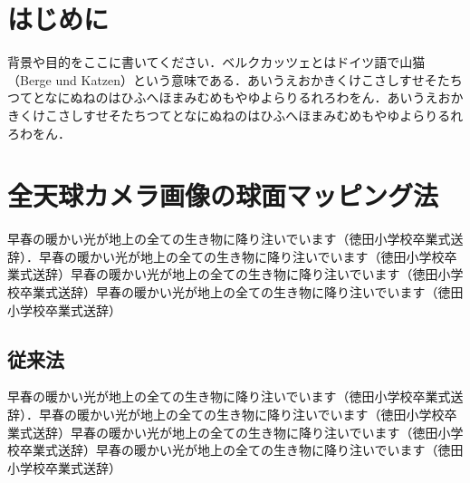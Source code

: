 \maketitle
\begin{multicols*}{2} %




\section{はじめに}
背景や目的をここに書いてください．ベルクカッツェとはドイツ語で山猫（Berge und Katzen）という意味である．あいうえおかきくけこさしすせそたちつてとなにぬねのはひふへほまみむめもやゆよらりるれろわをん．あいうえおかきくけこさしすせそたちつてとなにぬねのはひふへほまみむめもやゆよらりるれろわをん．

\section{全天球カメラ画像の球面マッピング法}
早春の暖かい光が地上の全ての生き物に降り注いでいます（徳田小学校卒業式送辞）．早春の暖かい光が地上の全ての生き物に降り注いでいます（徳田小学校卒業式送辞）早春の暖かい光が地上の全ての生き物に降り注いでいます（徳田小学校卒業式送辞）早春の暖かい光が地上の全ての生き物に降り注いでいます（徳田小学校卒業式送辞）
\subsection{従来法}
早春の暖かい光が地上の全ての生き物に降り注いでいます（徳田小学校卒業式送辞）．早春の暖かい光が地上の全ての生き物に降り注いでいます（徳田小学校卒業式送辞）早春の暖かい光が地上の全ての生き物に降り注いでいます（徳田小学校卒業式送辞）早春の暖かい光が地上の全ての生き物に降り注いでいます（徳田小学校卒業式送辞）

\end{multicols*}
